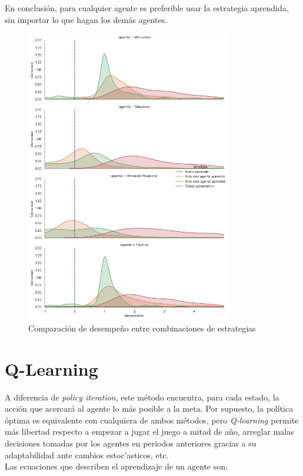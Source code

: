 En conclusi\'on, para cualquier agente es preferible usar la estrategia aprendida, sin importar lo que hagan los dem\'as agentes.


\begin{figure}[H]
\caption{Comparaci\'on de desempe\~no entre combinaciones de estrategias}
\label{ev_policies_dumb}
\includegraphics[width=9cm]{tesis_tex/figs/evaluating_policies_dumb_to_smart.png}
\centering
\end{figure}

\section{Q-Learning}

A diferencia de \textit{policy iteration}, este m\'etodo encuentra, para cada estado, la acci\'on que acercar\'a al agente lo m\'as posible a la meta. Por supuesto, la pol\'itica \'optima es equivalente con cualquiera de ambos m\'etodos, pero \textit{Q-learning} permite m\'as libertad respecto a empezar a jugar el juego a mitad de a\~no, arreglar malas decisiones tomadas por los agentes en periodos anteriores gracias a su adaptabilidad ante cambios estoc'asticos, etc.\\

Las ecuaciones que describen el aprendizaje de un agente son:

